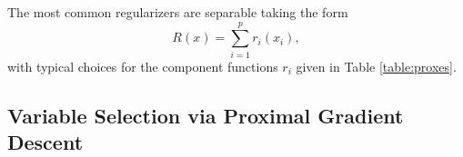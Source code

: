 The most common regularizers are separable taking the form
\begin{equation}\label{eq:R sep}
R(x) = \sum_{i = 1}^p r_i(x_i), 
\end{equation}
with typical choices for the component functions $r_i$ given in Table \ref{table:proxes}.


\subsection{Variable Selection via Proximal Gradient Descent}

